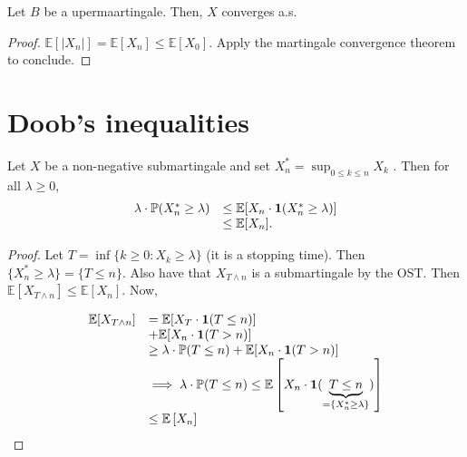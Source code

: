 \documentclass{article}
\begin{document}
\begin{boxcor}\label{cor: a.s. disc conv pos sup mg}
Let $ B$ be a upermaartingale. Then, $ X$ converges a.s.
\end{boxcor}

\begin{proof}
	$\mathbb{E}[|X_{n}|] =\mathbb{E}[X_{n}]\leq\mathbb{E}[X_{0}]$. Apply the martingale convergence theorem to conclude.
\end{proof}

 \section{Doob's inequalities}


\begin{theorem}\label{thm: doob maximal ineq discrete}
Let $ X$ be a non-negative submartingale and set $ X^{*}_{n} = \displaystyle\sup_{ 0\leq k \leq n}X_{k}$ . Then for all $ \lambda \geq 0$, 
\[
\begin{array}{ll}
	\lambda \cdot \mathbb{P}(X^{*}_{n}\geq \lambda ) &\leq\mathbb{E}[X_{n}\cdot \mathbf{1}(X^{*}_{n}\geq \lambda)] \\
						  &\leq\mathbb{E}[X_{n}].
\end{array}
\]


\end{theorem}


\begin{proof}
	Let $ T = \displaystyle\inf\{k\geq 0 : X_{k}\geq \lambda\}$ (it is a stopping time). Then $ \{X^{*}_{n}\geq \lambda\} = \{T\leq n\}$. Also have that $ X_{T\land n}$ is a submartingale by the OST. Then $\mathbb{E}[X_{T\land n}]\leq\mathbb{E}[X_{n}]$. Now, 

	\[
	\begin{array}{ll}
		\mathbb{E}[X_{T\land n}] &= \mathbb{E}[X_{T}\cdot \mathbf{1}(T\leq n)] \\
					 &+\mathbb{E}[X_{n}\cdot \mathbf{1}(T>n)]\\ 
					 &\geq \lambda \cdot \mathbb{P}(T\leq n)+\mathbb{E}[X_{n}\cdot \mathbf{1}(T>n)]\\ 
					 &\implies \lambda\cdot \mathbb{P}(T\leq n) \leq \mathbb{E}\left[ X_{n}\cdot \mathbf{1}(\underbrace{T\leq n}_{=\{X^{*}_{n}\geq \lambda\}}) \right]\\ 
					 &\leq \mathbb{E}\left[ X_{n} \right] 
	\end{array}
	\]
	
\end{proof}
\end{document}
